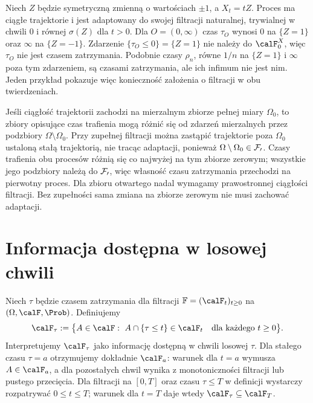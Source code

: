\begin{przyklad}
Niech $Z$ będzie symetryczną zmienną o wartościach $\pm1$,
a $X_t=tZ$. Proces ma ciągłe trajektorie i jest adaptowany
do swojej filtracji naturalnej, trywialnej w chwili $0$
i równej $\sigma(Z)$ dla $t>0$.
Dla $O=(0,\infty)$ czas $\tau_O$ wynosi $0$ na
$\{Z=1\}$ oraz $\infty$ na $\{Z=-1\}$.
Zdarzenie $\{\tau_O\le0\}=\{Z=1\}$ nie należy do
$\calF_0^X$, więc $\tau_O$ nie jest czasem zatrzymania.
Podobnie czasy $\rho_n$, równe $1/n$ na $\{Z=1\}$
i $\infty$ poza tym zdarzeniem, są czasami zatrzymania,
ale ich infimum nie jest nim. Jeden przykład pokazuje
więc konieczność założenia o filtracji w obu twierdzeniach.
\end{przyklad}

\begin{uwaga}
Jeśli ciągłość trajektorii zachodzi na mierzalnym
zbiorze pełnej miary $\Omega_0$, to zbiory opisujące
czas trafienia mogą różnić się od zdarzeń mierzalnych
przez podzbiory $\Omega\setminus\Omega_0$. Przy zupełnej filtracji można zastąpić trajektorie
poza $\Omega_0$ ustaloną stałą trajektorią, nie tracąc
adaptacji, ponieważ $\Omega\setminus\Omega_0\in\cal F_0$.
Czasy trafienia obu procesów różnią się co najwyżej
na tym zbiorze zerowym; wszystkie jego podzbiory należą
do $\cal F_0$, więc własność czasu zatrzymania przechodzi
na pierwotny proces. Dla zbioru otwartego nadal wymagamy
prawostronnej ciągłości filtracji. Bez zupełności sama
zmiana na zbiorze zerowym nie musi zachować adaptacji.
\end{uwaga}

\section{Informacja dostępna w losowej chwili}
\begin{definicja}
Niech $\tau$ będzie czasem zatrzymania dla filtracji
$\mathbb F=(\calF_t)_{t\ge0}$ na $(\Omega,\calF,\Prob)$.
Definiujemy
\[
\calF_\tau:=\big\{A\in\calF:\ 
A\cap\{\tau\le t\}\in\calF_t\quad
\text{dla każdego }t\ge0\big\}.
\]
Interpretujemy $\calF_\tau$ jako informację dostępną
w chwili losowej $\tau$. Dla stałego czasu $\tau=a$
otrzymujemy dokładnie $\calF_a$: warunek dla $t=a$
wymusza $A\in\calF_a$, a dla pozostałych chwil wynika
z monotoniczności filtracji lub pustego przecięcia.
Dla filtracji na $[0,T]$ oraz czasu $\tau\le T$
w definicji wystarczy rozpatrywać $0\le t\le T$;
warunek dla $t=T$ daje wtedy $\calF_\tau\subseteq\calF_T$.
\end{definicja}

